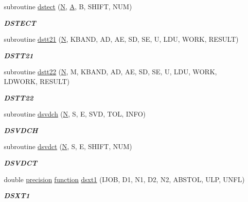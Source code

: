\begin{DoxyCompactItemize}
subroutine \hyperlink{group__double__eig_ga5467550660ec78049bd9d095d06fc25e}{dstect} (\hyperlink{polmisc_8c_a0240ac851181b84ac374872dc5434ee4}{N}, \hyperlink{classA}{A}, B, S\+H\+I\+F\+T, N\+U\+M)
\begin{DoxyCompactList}\small\item\em {\bfseries D\+S\+T\+E\+C\+T} \end{DoxyCompactList}\item 
subroutine \hyperlink{group__double__eig_gafcc98f0ae883a4f4a2be0bb1ae45b608}{dstt21} (\hyperlink{polmisc_8c_a0240ac851181b84ac374872dc5434ee4}{N}, K\+B\+A\+N\+D, A\+D, A\+E, S\+D, S\+E, U, L\+D\+U, W\+O\+R\+K, R\+E\+S\+U\+L\+T)
\begin{DoxyCompactList}\small\item\em {\bfseries D\+S\+T\+T21} \end{DoxyCompactList}\item 
subroutine \hyperlink{group__double__eig_gabffce2d056146c156467c485904cb413}{dstt22} (\hyperlink{polmisc_8c_a0240ac851181b84ac374872dc5434ee4}{N}, M, K\+B\+A\+N\+D, A\+D, A\+E, S\+D, S\+E, U, L\+D\+U, W\+O\+R\+K, L\+D\+W\+O\+R\+K, R\+E\+S\+U\+L\+T)
\begin{DoxyCompactList}\small\item\em {\bfseries D\+S\+T\+T22} \end{DoxyCompactList}\item 
subroutine \hyperlink{group__double__eig_ga970e8ed2adc72fcf96d412fcb3d33226}{dsvdch} (\hyperlink{polmisc_8c_a0240ac851181b84ac374872dc5434ee4}{N}, S, E, S\+V\+D, T\+O\+L, I\+N\+F\+O)
\begin{DoxyCompactList}\small\item\em {\bfseries D\+S\+V\+D\+C\+H} \end{DoxyCompactList}\item 
subroutine \hyperlink{group__double__eig_gacfc6bc302348dc1e4790a98d3bcefb67}{dsvdct} (\hyperlink{polmisc_8c_a0240ac851181b84ac374872dc5434ee4}{N}, S, E, S\+H\+I\+F\+T, N\+U\+M)
\begin{DoxyCompactList}\small\item\em {\bfseries D\+S\+V\+D\+C\+T} \end{DoxyCompactList}\item 
double \hyperlink{numinquire_8h_a2c8e616467665d0b2814d4c1589ba74e}{precision} \hyperlink{afunc_8m_a7b5e596df91eadea6c537c0825e894a7}{function} \hyperlink{group__double__eig_ga3ddc3e6002ccca1ee7b31370e4e8b523}{dsxt1} (I\+J\+O\+B, D1, N1, D2, N2, A\+B\+S\+T\+O\+L, U\+L\+P, U\+N\+F\+L)
\begin{DoxyCompactList}\small\item\em {\bfseries D\+S\+X\+T1} \end{DoxyCompactList}\item 

\end{DoxyCompactItemize}
